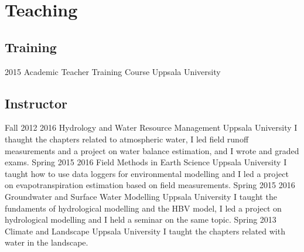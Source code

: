 \section{Teaching}
    \subsection{Training}
        \shortposition
            {2015}
            {Academic Teacher Training Course}
            {Uppsala University}
    \subsection{Instructor}
        \position
            {Fall 2012 \textemdash{} 2016}
            {Hydrology and Water Resource Management}
            {Uppsala University}
            {I thaught the chapters related to atmospheric water, I led field runoff measurements and a project on water balance estimation, and I wrote and graded exams.}
        \position
            {Spring 2015 \textemdash{} 2016}
            {Field Methods in Earth Science}
            {Uppsala University}
            {I taught how to use data loggers for environmental modelling and I led a project on evapotranspiration estimation based on field measurements.}
        \position
            {Spring 2015 \textemdash{} 2016}
            {Groundwater and Surface Water Modelling}
            {Uppsala University}
            {I taught the fundaments of hydrological modelling and the HBV model, I led a project on hydrological modelling and I held a seminar on the same topic.}
        \position
            {Spring 2013}
            {Climate and Landscape}
            {Uppsala University}
            {I taught the chapters related with water in the landscape.}

